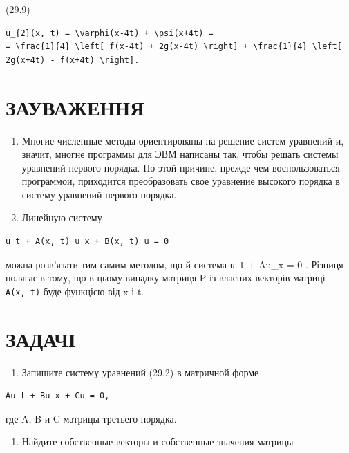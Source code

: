 \documentclass[
  ukrainian,
]{article}
\providecommand{\tightlist}{%
  \setlength{\itemsep}{0pt}\setlength{\parskip}{0pt}}
\begin{document}
(29.9)

\begin{verbatim}
u_{2}(x, t) = \varphi(x-4t) + \psi(x+4t) =
= \frac{1}{4} \left[ f(x-4t) + 2g(x-4t) \right] + \frac{1}{4} \left[ 2g(x+4t) - f(x+4t) \right].
\end{verbatim}

\section{ЗАУВАЖЕННЯ}\label{ux437ux430ux443ux432ux430ux436ux435ux43dux43dux44f-1}

\begin{enumerate}
\def\labelenumi{\arabic{enumi}.}
\item
  Многие численные методы ориентированы на решение систем уравнений и,
  значит, многне программы для ЭВМ написаны так, чтобы решать системы
  уравнений первого порядка. По этой причине, прежде чем воспользоваться
  программои, приходится преобразовать свое уравнение высокого порядка в
  систему уравнений первого порядка.
\item
  Линейную систему
\end{enumerate}

\begin{verbatim}
u_t + A(x, t) u_x + B(x, t) u = 0
\end{verbatim}

можна розв'язати тим самим методом, що й система \texttt{u\_t} + Au\_x =
0 . Різниця полягає в тому, що в цьому випадку матриця P із власних
векторів матриці \texttt{A(x,\ t)} буде функцією від x і t.

\section{ЗАДАЧІ}\label{ux437ux430ux434ux430ux447ux456}

\begin{enumerate}
\def\labelenumi{\arabic{enumi}.}
\tightlist
\item
  Запишите систему уравнений (29.2) в матричной форме
\end{enumerate}

\begin{verbatim}
Au_t + Bu_x + Cu = 0,
\end{verbatim}

где A, B и C-матрицы третьего порядка.

\begin{enumerate}
\def\labelenumi{\arabic{enumi}.}
\setcounter{enumi}{1}
\tightlist
\item
  Найдите собственные векторы и собственные значения матрицы
\end{enumerate}
\end{document}
